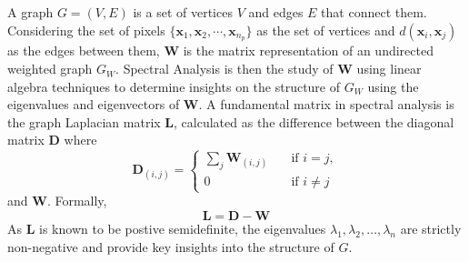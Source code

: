 A graph $G = (V,E)$ is a set of vertices $V$ and edges $E$ that connect them. Considering the set of pixels $\{\mathbf{x}_1, \mathbf{x}_2 , \cdots , \mathbf{x}_{n_p} \}$ as the set of vertices and $d(\mathbf{x}_i, \mathbf{x}_j)$ as the edges between them, $\mathbf{W}$ is the matrix representation of an undirected weighted graph $G_W$. Spectral Analysis is then the study of $\mathbf{W}$ using linear algebra techniques to determine insights on the structure of $G_W$ using the eigenvalues and eigenvectors of $\mathbf{W}$. A fundamental matrix in spectral analysis is the graph Laplacian matrix $\mathbf{L}$, calculated as the difference between the diagonal matrix $\mathbf{D}$ where
\begin{equation}
    \label{sc:d-mtx}
    \mathbf{D}_{(i,j)} = \begin{cases}
        \sum _{j}\mathbf{W}_{(i,j)} &\quad \text{if } i = j,\\
        0 & \quad \text{if } i \neq j
    \end{cases}
\end{equation}
and $\mathbf{W}$. Formally,
\begin{equation}
    \label{sc:laplacian-mtx}
    \mathbf{L} = \mathbf{D} - \mathbf{W} 
\end{equation}
As $\mathbf{L}$ is known to be postive semidefinite, the eigenvalues $\lambda_1, \lambda_2, \dots, \lambda_{n}$ are strictly non-negative and provide key insights into the structure of $G$.